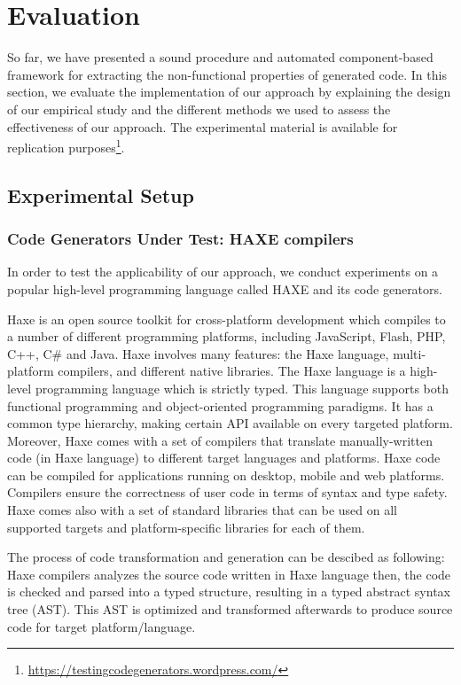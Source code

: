 \section{Evaluation}
So far, we have presented a sound procedure and automated component-based framework for extracting the non-functional properties of generated code. In this section, we evaluate the implementation of our approach by explaining the design of our empirical study and the different methods we used to assess the effectiveness of our approach. 
The experimental material is available for replication purposes\footnote{\url{https://testingcodegenerators.wordpress.com/}}.
\subsection{Experimental Setup}
\subsubsection{Code Generators Under Test: HAXE compilers}
In order to test the applicability of our approach, we conduct experiments on a popular high-level programming language called HAXE and its code generators.

Haxe is an open source toolkit for cross-platform development which compiles to a number of different programming platforms, including JavaScript, Flash, PHP, C++, C\# and Java. Haxe involves many features: the Haxe language, multi-platform compilers, and different native libraries. 
The Haxe language is a high-level programming language which is strictly typed. This language supports both functional programming and object-oriented programming paradigms. It has a common type hierarchy, making certain API available on every targeted platform.
Moreover, Haxe comes with a set of compilers that translate manually-written code (in Haxe language) to different target languages and platforms. 
Haxe code can be compiled for applications running on desktop, mobile and web platforms. Compilers ensure the correctness of user code in terms of syntax and type safety.
Haxe comes also with a set of standard libraries that can be used on all supported targets and platform-specific libraries for each of them.

The process of code transformation and generation can be descibed as following: Haxe compilers analyzes the source code written in Haxe language then, the code is checked and parsed into a typed structure, resulting in a typed abstract syntax tree (AST). This AST is optimized and transformed afterwards to produce source code for target platform/language.

